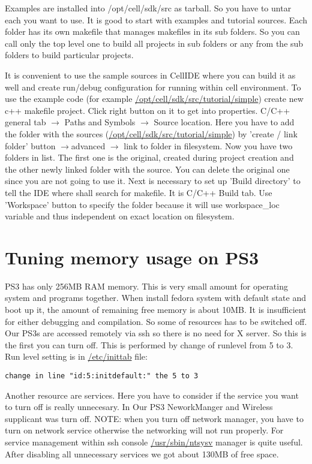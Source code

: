 Examples are installed into /opt/cell/sdk/src as tarball.
So you have to untar each you want to use.
It is good to start with examples and tutorial sources.
Each folder has its own makefile that manages makefiles in its sub folders.
So you can call only the top level one to build all projects in sub folders or any from the sub folders to build particular projects.

It is convenient to use the sample sources in CellIDE where you can build it as well and create run/debug configuration for running within cell environment.
To use the example code (for example \url{/opt/cell/sdk/src/tutorial/simple}) create new c++ makefile project.
Click right button on it to get into properties.
C/C++ general tab $\rightarrow$ Paths and Symbols $\rightarrow$ Source location.
Here you have to add the folder with the sources (\url{/opt/cell/sdk/src/tutorial/simple}) by 'create / link folder' button $\rightarrow$advanced $\rightarrow$ link to folder in filesystem.
Now you have two folders in list. The first one is the original, created during project creation and the other newly linked folder with the source.
You can delete the original one since you are not going to use it.
Next is necessary to set up 'Build directory' to tell the IDE where shall search for makefile.
It is C/C++ Build tab. Use 'Workspace' button to specify the folder because it will use workspace\_loc variable and thus independent on exact location on filesystem.

\section{Tuning memory usage on PS3}
\label{ps3MemoryUsage}

PS3 has only 256MB RAM memory.
This is very small amount for operating system and programs together.
When install fedora system with default state and boot up it, the amount of remaining free memory is about 10MB.
It is insufficient for either debugging and compilation.
So some of resources has to be switched off.
Our PS3s are accessed remotely via ssh so there is no need for X server.
So this is the first you can turn off. This is performed by change of runlevel from 5 to 3.
Run level setting is in \url{/etc/inittab} file:
\begin{verbatim}
change in line "id:5:initdefault:" the 5 to 3
\end{verbatim}
Another resource are services.
Here you have to consider if the service you want to turn off is really unnecesary.
In Our PS3 NeworkManger and Wireless supplicant was turn off.
NOTE: when you turn off network manager, you have to turn on network service otherwise the networking will not run properly.
For service management within ssh console \url{/usr/sbin/ntsysv} manager is quite useful.
After disabling all unnecessary services we got about 130MB of free space.

